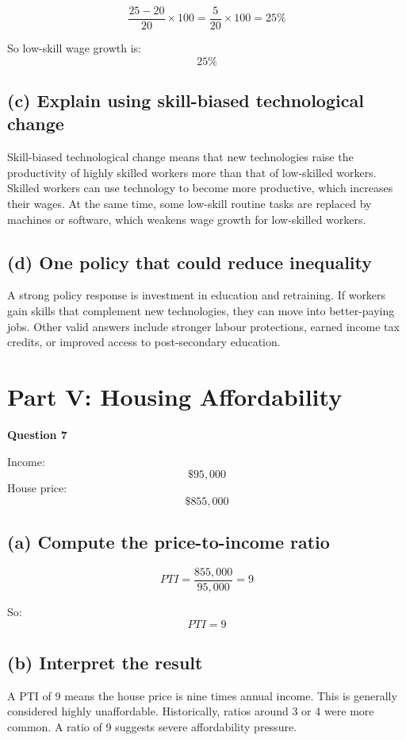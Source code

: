 \documentclass[12pt]{article}
\begin{document}
\[
\frac{25 - 20}{20} \times 100
=
\frac{5}{20} \times 100
= 25\%
\]

So low-skill wage growth is:
\[
\boxed{25\%}
\]

\subsection*{(c) Explain using skill-biased technological change}

Skill-biased technological change means that new technologies raise the productivity of highly skilled workers more than that of low-skilled workers. Skilled workers can use technology to become more productive, which increases their wages. At the same time, some low-skill routine tasks are replaced by machines or software, which weakens wage growth for low-skilled workers.

\subsection*{(d) One policy that could reduce inequality}

A strong policy response is investment in education and retraining. If workers gain skills that complement new technologies, they can move into better-paying jobs. Other valid answers include stronger labour protections, earned income tax credits, or improved access to post-secondary education.

\section*{Part V: Housing Affordability}

\textbf{Question 7}

Income:
\[
\$95{,}000
\]
House price:
\[
\$855{,}000
\]

\subsection*{(a) Compute the price-to-income ratio}

\[
PTI = \frac{855{,}000}{95{,}000} = 9
\]

So:
\[
\boxed{PTI = 9}
\]

\subsection*{(b) Interpret the result}

A PTI of 9 means the house price is nine times annual income. This is generally considered highly unaffordable. Historically, ratios around 3 or 4 were more common. A ratio of 9 suggests severe affordability pressure.
\end{document}
